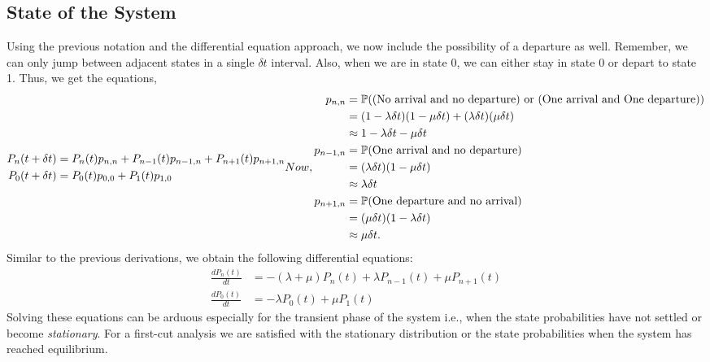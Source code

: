\documentclass[11pt, a4paper]{report}
\begin{document}
\subsection{State of the System}
Using the previous notation and the differential equation approach, we now include the possibility of a departure as well. Remember, we can only jump between adjacent states in a single $\delta t$ interval. Also, when we are in state 0, we can either stay in state 0 or depart to state 1.
Thus, we get the equations,
\begin{subequations}
    \begin{align}
        P_n(t + \delta t) &= P_n(t) p_{n, n} + P_{n-1}(t)p_{n-1, n} + P_{n+1}(t) p_{n+1, n} \\
        P_0(t + \delta t) &= P_0(t)p_{0, 0} + P_1(t)p_{1, 0}
    \end{align}
    Now, 
    \begin{align}
        p_{n, n} &= \sP(\text{(No arrival and no departure) or (One arrival and One departure)}) \\ 
        &= (1 - \lambda \delta t)(1 - \mu \delta t) + (\lambda \delta t)(\mu \delta t) \\
        &\approx 1 - \lambda \delta t - \mu \delta t \\
        p_{n-1, n} &= \sP(\text{One arrival and no departure}) \\
        &= (\lambda \delta t)(1 - \mu \delta t) \\
        &\approx \lambda \delta t \\
        p_{n+1, n} &= \sP(\text{One departure and no arrival})\\
        &= (\mu \delta t)(1 - \lambda \delta t) \\
        & \approx \mu \delta t.  
    \end{align}  
    \label{eq:stateMM1}
\end{subequations}
Similar to the previous derivations, we obtain
 the following differential equations:
\begin{subequations}
    \begin{align}
        \frac{d P_n(t)}{d t} &= -(\lambda + \mu) P_n(t) + \lambda P_{n-1}(t) + \mu P_{n+1}(t) \\
        \frac{d P_0(t)}{d t} &= -\lambda P_0(t) + \mu P_{1}(t) 
    \end{align}
\end{subequations}
Solving these equations can be arduous especially for the transient phase of the system i.e., when the state probabilities have not settled or become \emph{stationary}. For a first-cut analysis we are satisfied with the stationary distribution or the state probabilities when the system has reached equilibrium.
\end{document}
